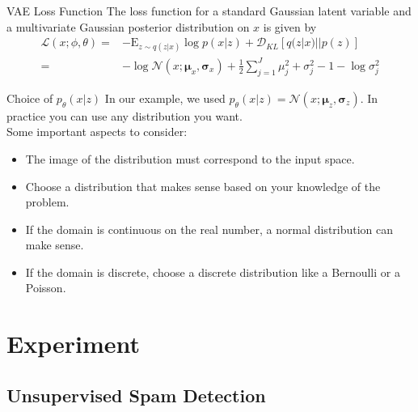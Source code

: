 \documentclass{beamer}
\newcommand{\kldiv}{\mathcal{D}_{KL}}
\newcommand{\E}{\mathrm{E}}
\begin{document}
\begin{frame}[fragile]{VAE Loss Function}
	The loss function for a standard Gaussian latent variable and a multivariate Gaussian posterior distribution on $x$ is given by 
	\begin{equation}
	\begin{split}
			\mathcal{L}(x;\phi, \theta) 
			=& -\E_{z\sim q(z|x)}\log p(x|z) + \kldiv[q(z|x)||p(z)]\\
			=& -\log \mathcal{N}(x;\bm{\mu}_x, \bm{\sigma}_x) + \frac{1}{2}\sum_{j=1}^J \mu_j^2 + \sigma_j^2 - 1 - \log \sigma_j^2
	\end{split}
	\end{equation}
\end{frame}

\begin{frame}{Choice of $p_\theta(x|z)$}
	In our example, we used $p_\theta(x|z)=\mathcal{N}(x;\bm{\mu}_z, \bm{\sigma}_z)$. In practice you can use any distribution you want. \\
	
	Some important aspects to consider:
	\begin{itemize}
		\item The image of the distribution must correspond to the input space.\pause
		\item Choose a distribution that makes sense based on your knowledge of the problem. \pause
		\item If the domain is continuous on the real number, a normal distribution can make sense. \pause
		\item If the domain is discrete, choose a discrete distribution like a Bernoulli or a Poisson.
	\end{itemize}
\end{frame}

\section{Experiment}

\subsection{Unsupervised Spam Detection}
\end{document}
